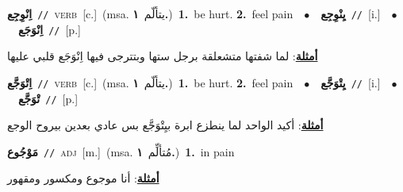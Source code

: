 \documentclass[10pt,a4paper,twoside]{article} %
\begin{document}
\begin{multicols}{2}
{{{{{{{{{{{\setlength\topsep{0pt}\textbf{\foreignlanguage{arabic}{اِنْوِجِع}}\ {\color{gray}\texttt{//}\color{black}}\ \textsc{verb}\ [c.]\ \color{gray}(msa. \foreignlanguage{arabic}{يتألّم}~\foreignlanguage{arabic}{\textbf{١.}})\color{black}\ \textbf{1.}~be hurt.  \textbf{2.}~feel pain\ \ $\bullet$\ \ \setlength\topsep{0pt}\textbf{\foreignlanguage{arabic}{يِنْوِجِع}}\ {\color{gray}\texttt{//}\color{black}}\ [i.]\ \ $\bullet$\ \ \setlength\topsep{0pt}\textbf{\foreignlanguage{arabic}{اِنْوَجَع}}\ {\color{gray}\texttt{//}\color{black}}\ [p.]\  \begin{flushright}\color{gray}\foreignlanguage{arabic}{\textbf{\underline{\foreignlanguage{arabic}{أمثلة}}}: لما شفتها متشعلقة برجل ستها وبتترجى فيها اِنْوَجَع قلبي عليها}\end{flushright}\color{black}} \vspace{2mm}

{\setlength\topsep{0pt}\textbf{\foreignlanguage{arabic}{اِتْوَجَّع}}\ {\color{gray}\texttt{//}\color{black}}\ \textsc{verb}\ [c.]\ \color{gray}(msa. \foreignlanguage{arabic}{يتألّم}~\foreignlanguage{arabic}{\textbf{١.}})\color{black}\ \textbf{1.}~be hurt.  \textbf{2.}~feel pain\ \ $\bullet$\ \ \setlength\topsep{0pt}\textbf{\foreignlanguage{arabic}{يِتْوَجَّع}}\ {\color{gray}\texttt{//}\color{black}}\ [i.]\ \ $\bullet$\ \ \setlength\topsep{0pt}\textbf{\foreignlanguage{arabic}{تْوَجَّع}}\ {\color{gray}\texttt{//}\color{black}}\ [p.]\  \begin{flushright}\color{gray}\foreignlanguage{arabic}{\textbf{\underline{\foreignlanguage{arabic}{أمثلة}}}: أكيد الواحد لما ينطزع ابرة بيِتْوَجَّع بس عادي بعدين بيروح الوجع}\end{flushright}\color{black}} \vspace{2mm}

{\setlength\topsep{0pt}\textbf{\foreignlanguage{arabic}{مَوْجُوع}}\ {\color{gray}\texttt{//}\color{black}}\ \textsc{adj}\ [m.]\ \color{gray}(msa. \foreignlanguage{arabic}{مُتألِّم}~\foreignlanguage{arabic}{\textbf{١.}})\color{black}\ \textbf{1.}~in pain\  \begin{flushright}\color{gray}\foreignlanguage{arabic}{\textbf{\underline{\foreignlanguage{arabic}{أمثلة}}}: أنا موجوع ومكسور ومقهور}\end{flushright}\color{black}} \vspace{2mm}

}}}}}}}}}}
\end{multicols}
\end{document}
